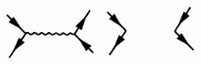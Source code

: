 \begin{equation}
\begin{tikzpicture}[x=0.65pt,y=0.65pt,yscale=-1,xscale=1]
\draw [line width=1.5]    (479.13,501.46) -- (505.46,527.64) ;
\draw [line width=1.5]    (573.45,528.52) -- (599.78,554.69) ;
\draw [line width=1.5]    (505.46,527.64) -- (482.35,561.51) ;
\draw [line width=1.5]    (595.22,494.96) -- (573.45,528.52) ;
\draw  [fill={rgb, 255:red, 0; green, 0; blue, 0 }  ,fill opacity=1 ] (498.9,521.5) -- (482.16,510.96) -- (489.23,504.24) -- cycle ;
\draw  [fill={rgb, 255:red, 0; green, 0; blue, 0 }  ,fill opacity=1 ] (593.63,548.14) -- (576.29,538.63) -- (582.94,531.5) -- cycle ;
\draw  [fill={rgb, 255:red, 0; green, 0; blue, 0 }  ,fill opacity=1 ] (578.64,519.44) -- (586.12,501.14) -- (593.96,506.94) -- cycle ;
\draw  [fill={rgb, 255:red, 0; green, 0; blue, 0 }  ,fill opacity=1 ] (488.19,552.26) -- (495.71,533.97) -- (503.54,539.79) -- cycle ;
\draw [line width=1.5]    (365.46,531.64) .. controls (367.15,529.99) and (368.81,530.01) .. (370.46,531.7) .. controls (372.11,533.39) and (373.77,533.41) .. (375.46,531.77) .. controls (377.15,530.12) and (378.81,530.14) .. (380.46,531.83) .. controls (382.11,533.52) and (383.77,533.54) .. (385.46,531.9) .. controls (387.15,530.25) and (388.81,530.27) .. (390.46,531.96) .. controls (392.11,533.65) and (393.77,533.67) .. (395.46,532.03) .. controls (397.15,530.38) and (398.81,530.4) .. (400.46,532.09) .. controls (402.11,533.78) and (403.77,533.8) .. (405.46,532.15) .. controls (407.15,530.51) and (408.81,530.53) .. (410.46,532.22) .. controls (412.11,533.91) and (413.77,533.93) .. (415.46,532.28) .. controls (417.15,530.64) and (418.81,530.66) .. (420.45,532.35) .. controls (422.1,534.04) and (423.76,534.06) .. (425.45,532.41) .. controls (427.14,530.77) and (428.8,530.79) .. (430.45,532.48) -- (433.45,532.52) -- (433.45,532.52) ;
\draw [line width=1.5]    (339.13,505.46) -- (365.46,531.64) ;
\draw [line width=1.5]    (433.45,532.52) -- (459.78,558.69) ;
\draw [line width=1.5]    (365.46,531.64) -- (342.35,565.51) ;
\draw [line width=1.5]    (455.22,498.96) -- (433.45,532.52) ;
\draw  [fill={rgb, 255:red, 0; green, 0; blue, 0 }  ,fill opacity=1 ] (359.33,525.05) -- (341.95,515.63) -- (348.56,508.47) -- cycle ;
\draw  [fill={rgb, 255:red, 0; green, 0; blue, 0 }  ,fill opacity=1 ] (439.8,538.87) -- (456.86,548.87) -- (450.01,555.81) -- cycle ;
\draw  [fill={rgb, 255:red, 0; green, 0; blue, 0 }  ,fill opacity=1 ] (449.28,507.53) -- (443.58,526.46) -- (435.22,521.44) -- cycle ;
\draw  [fill={rgb, 255:red, 0; green, 0; blue, 0 }  ,fill opacity=1 ] (348.02,556.14) -- (355.95,538.02) -- (363.64,544.01) -- cycle ;


\end{tikzpicture}
\end{equation}
